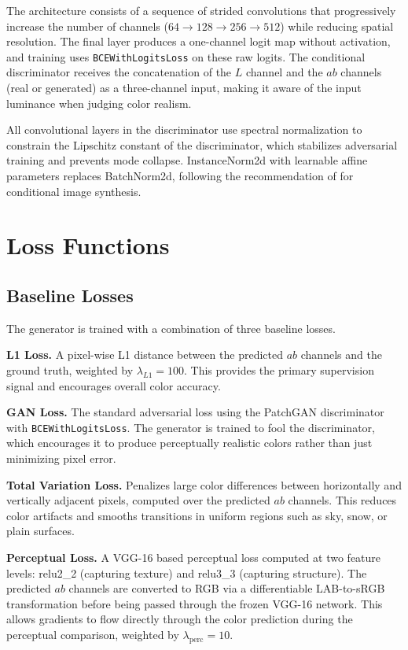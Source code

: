 \documentclass[12pt, a4paper, oneside]{report}
\begin{document}
    The architecture consists of a sequence of strided convolutions that progressively
    increase the number of channels ($64 \to 128 \to 256 \to 512$) while reducing
    spatial resolution. The final layer produces a one-channel logit map without
    activation, and training uses \texttt{BCEWithLogitsLoss} on these raw logits.
    The conditional discriminator receives the concatenation of the $L$ channel and
    the $ab$ channels (real or generated) as a three-channel input, making it aware
    of the input luminance when judging color realism.

    All convolutional layers in the discriminator use spectral normalization
    \cite{miyato2018spectral} to constrain the Lipschitz constant of the
    discriminator, which stabilizes adversarial training and prevents mode collapse.
    InstanceNorm2d with learnable affine parameters replaces BatchNorm2d, following
    the recommendation of \cite{isola2017image} for conditional image synthesis.

\section{Loss Functions}

    \subsection{Baseline Losses}

    The generator is trained with a combination of three baseline losses.

    \textbf{L1 Loss.} A pixel-wise L1 distance between the predicted $ab$ channels
    and the ground truth, weighted by $\lambda_{L1} = 100$. This provides the primary
    supervision signal and encourages overall color accuracy.

    \textbf{GAN Loss.} The standard adversarial loss \cite{goodfellow2014generative}
    using the PatchGAN discriminator with \texttt{BCEWithLogitsLoss}. The generator
    is trained to fool the discriminator, which encourages it to produce perceptually
    realistic colors rather than just minimizing pixel error.

    \textbf{Total Variation Loss.} Penalizes large color differences between
    horizontally and vertically adjacent pixels, computed over the predicted $ab$
    channels. This reduces color artifacts and smooths transitions in uniform regions
    such as sky, snow, or plain surfaces.

    \textbf{Perceptual Loss.} A VGG-16 based perceptual loss \cite{johnson2016perceptual}
    computed at two feature levels: relu2\_2 (capturing texture) and relu3\_3
    (capturing structure). The predicted $ab$ channels are converted to RGB via a
    differentiable LAB-to-sRGB transformation before being passed through the frozen
    VGG-16 network. This allows gradients to flow directly through the color
    prediction during the perceptual comparison, weighted by $\lambda_{\text{perc}} = 10$.
\end{document}
